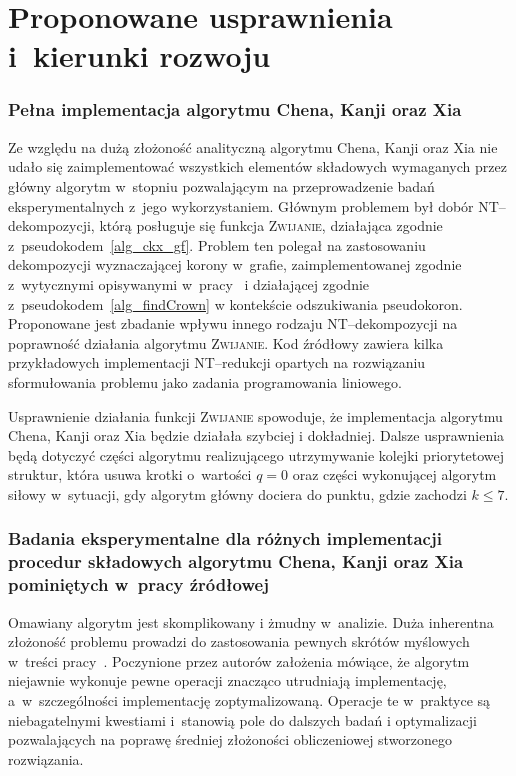 \section*{Proponowane usprawnienia i~kierunki rozwoju}\label{s_improvements}
\addtocounter{section}{1}
  \subsubsection{\textbf{Pełna implementacja algorytmu Chena, Kanji oraz Xia}}\label{sss_problems_ckx}

  Ze względu na dużą złożoność analityczną algorytmu Chena, Kanji oraz Xia nie udało się zaimplementować wszystkich elementów składowych wymaganych przez główny algorytm w~stopniu pozwalającym na przeprowadzenie badań eksperymentalnych z~jego wykorzystaniem.
  Głównym problemem był dobór NT--dekompozycji, którą posługuje się funkcja \textsc{Zwijanie}, działająca zgodnie z~pseudokodem~\ref{alg_ckx_gf}.
  Problem ten polegał na zastosowaniu dekompozycji wyznaczającej korony w~grafie, zaimplementowanej zgodnie z~wytycznymi opisywanymi w~pracy~\cite{KernelizationAlgorithms04} i działającej zgodnie z~pseudokodem~\ref{alg_findCrown} w kontekście odszukiwania pseudokoron.
  Proponowane jest zbadanie wpływu innego rodzaju NT--dekompozycji na poprawność działania algorytmu \textsc{Zwijanie}.
  Kod źródłowy zawiera kilka przykładowych implementacji NT--redukcji opartych na rozwiązaniu sformułowania problemu jako zadania programowania liniowego.

  Usprawnienie działania funkcji \textsc{Zwijanie} spowoduje, że implementacja algorytmu Chena, Kanji oraz Xia będzie działała szybciej i dokładniej.
  Dalsze usprawnienia będą dotyczyć części algorytmu realizującego utrzymywanie kolejki priorytetowej struktur, która usuwa krotki o~wartości $q = 0$ oraz części wykonującej algorytm siłowy w~sytuacji, gdy algorytm główny dociera do punktu, gdzie zachodzi $k \leq 7$.

  \subsubsection{\textbf{Badania eksperymentalne dla różnych implementacji procedur składowych algorytmu Chena, Kanji oraz Xia pominiętych w~pracy źródłowej}}

  Omawiany algorytm jest skomplikowany i żmudny w~analizie.
  Duża inherentna złożoność problemu prowadzi do zastosowania pewnych skrótów myślowych w~treści pracy~\cite{ImprovedBounds10}.
  Poczynione przez autorów założenia mówiące, że algorytm niejawnie wykonuje pewne operacji znacząco utrudniają implementację, a~w~szczególności implementację zoptymalizowaną.
  Operacje te w~praktyce są niebagatelnymi kwestiami i~stanowią pole do dalszych badań i optymalizacji pozwalających na poprawę średniej złożoności obliczeniowej stworzonego rozwiązania.

